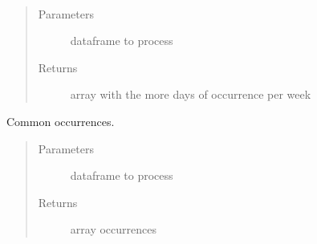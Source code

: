 \documentclass[letterpaper,10pt,english]{sphinxmanual}
\begin{document}
\begin{fulllineitems}
\label{\detokenize{algorithms:algorithms.idp.idp.days_week_more_occurrences}}~\begin{quote}\begin{description}
\item[{Parameters}] \leavevmode
\sphinxAtStartPar
{} \textendash{} dataframe to process

\item[{Returns}] \leavevmode
\sphinxAtStartPar
array with the more days of occurrence per week

\end{description}\end{quote}

\end{fulllineitems}


\begin{fulllineitems}
\label{\detokenize{algorithms:algorithms.idp.idp.get_df_common_occurrences}}
\sphinxAtStartPar
Common occurrences.
\begin{quote}\begin{description}
\item[{Parameters}] \leavevmode
\sphinxAtStartPar
{} \textendash{} dataframe to process

\item[{Returns}] \leavevmode
\sphinxAtStartPar
array occurrences

\end{description}\end{quote}

\end{fulllineitems}

\end{document}
